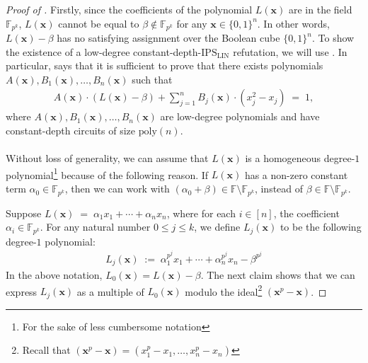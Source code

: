 \documentclass[11pt]{article}
\newcommand{\Boo}{\{0,1 \}}
\newcommand{\F}{\mathbb{F}}
\newcommand{\IPSLIN}{\mathrm{IPS}_{\mathrm{LIN}}}
\begin{document}
\begin{proof}[Proof of ]
Firstly, since the coefficients of the polynomial $L(\mathbf{x})$ are in the field $\F_{p^{k}}$, $L(\mathbf{x})$ cannot be equal to $\beta \notin \F_{p^{k}}$ for any $\mathbf{x} \in \Boo^{n}$. In other words, $L(\mathbf{x}) - \beta$ has no satisfying assignment over the Boolean cube $\Boo^{n}$.\newline
To show the existence of a low-degree constant-depth-$\IPSLIN$ refutation, we will use . In particular,  says that it is sufficient to prove that there exists polynomials $A(\mathbf{x}), B_{1}(\mathbf{x}), \ldots, B_{n}(\mathbf{x})$ such that
\begin{align*}
    A(\mathbf{x}) \cdot (L(\mathbf{x}) - \beta) + \sum_{j = 1}^{n} B_{j}(\mathbf{x}) \cdot (x_{j}^{2} - x_{j}) \; = \; 1,
\end{align*}
where $A(\mathbf{x}), B_{1}(\mathbf{x}), \ldots, B_{n}(\mathbf{x})$ are low-degree polynomials and have constant-depth circuits of size $\mathrm{poly}(n)$.

\paragraph{}Without loss of generality, we can assume that $L(\mathbf{x})$ is a homogeneous degree-$1$ polynomial\footnote{For the sake of less cumbersome notation} because of the following reason. If $L(\mathbf{x})$ has a non-zero constant term $\alpha_{0} \in \F_{p^{k}}$, then we can work with $(\alpha_{0} + \beta) \in \F \setminus \F_{p^{k}}$, instead of $\beta \in \F \setminus \F_{p^{k}}$.\newline

\noindent
Suppose $L(\mathbf{x}) \; = \; \alpha_{1} x_{1} + \cdots + \alpha_{n} x_{n}$, where for each $i \in [n]$, the coefficient $\alpha_{i} \in \F_{p^{k}}$. For any natural number $0 \leq j \leq k$, we define $L_{j}(\mathbf{x})$ to be the following degree-$1$ polynomial:
\begin{align*}
    L_{j}(\mathbf{x}) \; := \; \alpha_{1}^{p^{j}} x_{1} + \cdots + \alpha_{n}^{p^{j}} x_{n} - \beta^{p^{j}}
\end{align*}
In the above notation, $L_{0}(\mathbf{x}) = L(\mathbf{x}) - \beta$. The next claim shows that we can express $L_{j}(\mathbf{x})$ as a multiple of $L_{0}(\mathbf{x})$ modulo the ideal\footnote{Recall that $(\mathbf{x}^{p} - \mathbf{x}) = (x_{1}^{p} - x_{1}, \ldots, x_{n}^{p} - x_{n})$} $( \mathbf{x}^{p} - \mathbf{x})$.


\end{proof}
\end{document}
